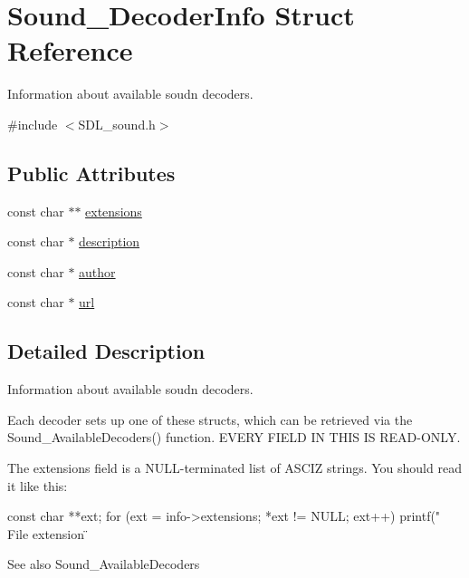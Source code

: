 \hypertarget{structSound__DecoderInfo}{\section{Sound\-\_\-\-Decoder\-Info Struct Reference}
\label{structSound__DecoderInfo}
}


Information about available soudn decoders.  




{\ttfamily \#include $<$S\-D\-L\-\_\-sound.\-h$>$}

\subsection*{Public Attributes}
\begin{DoxyCompactItemize}
\item 
const char $\ast$$\ast$ \hyperlink{structSound__DecoderInfo_a9f11db9acb555302fd84509198683e2a}{extensions}
\item 
const char $\ast$ \hyperlink{structSound__DecoderInfo_ac1241b30e4121aedd4286351b27f93d5}{description}
\item 
const char $\ast$ \hyperlink{structSound__DecoderInfo_a1d3c5d5d46b0f5e5026944002e1d6e36}{author}
\item 
const char $\ast$ \hyperlink{structSound__DecoderInfo_aa983be8195cd74f7dcaab2f4788309fb}{url}
\end{DoxyCompactItemize}


\subsection{Detailed Description}
Information about available soudn decoders. 

Each decoder sets up one of these structs, which can be retrieved via the Sound\-\_\-\-Available\-Decoders() function. E\-V\-E\-R\-Y F\-I\-E\-L\-D I\-N T\-H\-I\-S I\-S R\-E\-A\-D-\/\-O\-N\-L\-Y.

The extensions field is a N\-U\-L\-L-\/terminated list of A\-S\-C\-I\-Z strings. You should read it like this\-:


\begin{DoxyCode}
 const char **ext;
 for (ext = info->extensions; *ext != NULL; ext++) {
     printf("   File extension \"%
 }
\end{DoxyCode}


\begin{DoxySeeAlso}{See also}
Sound\-\_\-\-Available\-Decoders 
\end{DoxySeeAlso}


